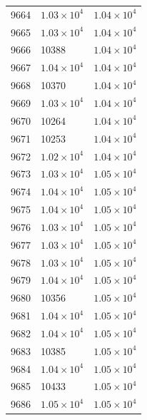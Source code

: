 \begin{table}[H]
\begin{tabular}{lll}
9664 & $\displaystyle 1.03 \times 10^{4}$ & $\displaystyle 1.04 \times 10^{4}$ \\
9665 & $\displaystyle 1.03 \times 10^{4}$ & $\displaystyle 1.04 \times 10^{4}$ \\
9666 & 10388 & $\displaystyle 1.04 \times 10^{4}$ \\
9667 & $\displaystyle 1.04 \times 10^{4}$ & $\displaystyle 1.04 \times 10^{4}$ \\
9668 & 10370 & $\displaystyle 1.04 \times 10^{4}$ \\
9669 & $\displaystyle 1.03 \times 10^{4}$ & $\displaystyle 1.04 \times 10^{4}$ \\
9670 & 10264 & $\displaystyle 1.04 \times 10^{4}$ \\
9671 & 10253 & $\displaystyle 1.04 \times 10^{4}$ \\
9672 & $\displaystyle 1.02 \times 10^{4}$ & $\displaystyle 1.04 \times 10^{4}$ \\
9673 & $\displaystyle 1.03 \times 10^{4}$ & $\displaystyle 1.05 \times 10^{4}$ \\
9674 & $\displaystyle 1.04 \times 10^{4}$ & $\displaystyle 1.05 \times 10^{4}$ \\
9675 & $\displaystyle 1.04 \times 10^{4}$ & $\displaystyle 1.05 \times 10^{4}$ \\
9676 & $\displaystyle 1.03 \times 10^{4}$ & $\displaystyle 1.05 \times 10^{4}$ \\
9677 & $\displaystyle 1.03 \times 10^{4}$ & $\displaystyle 1.05 \times 10^{4}$ \\
9678 & $\displaystyle 1.03 \times 10^{4}$ & $\displaystyle 1.05 \times 10^{4}$ \\
9679 & $\displaystyle 1.04 \times 10^{4}$ & $\displaystyle 1.05 \times 10^{4}$ \\
9680 & 10356 & $\displaystyle 1.05 \times 10^{4}$ \\
9681 & $\displaystyle 1.04 \times 10^{4}$ & $\displaystyle 1.05 \times 10^{4}$ \\
9682 & $\displaystyle 1.04 \times 10^{4}$ & $\displaystyle 1.05 \times 10^{4}$ \\
9683 & 10385 & $\displaystyle 1.05 \times 10^{4}$ \\
9684 & $\displaystyle 1.04 \times 10^{4}$ & $\displaystyle 1.05 \times 10^{4}$ \\
9685 & 10433 & $\displaystyle 1.05 \times 10^{4}$ \\
9686 & $\displaystyle 1.05 \times 10^{4}$ & $\displaystyle 1.05 \times 10^{4}$ \\

\end{tabular}
\end{table}
